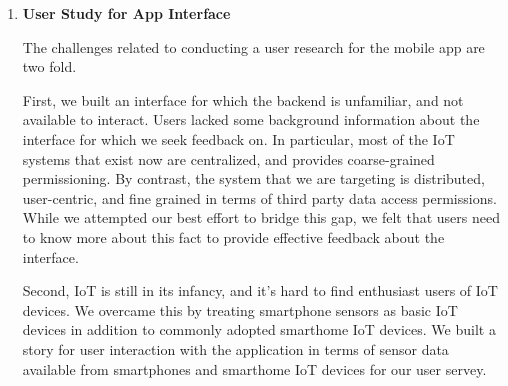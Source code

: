 \begin{enumerate}
\item \textbf{User Study for App Interface}

The challenges related to conducting a user research for the mobile app are two fold.

First, we built an interface for which the backend is unfamiliar, and not available to interact. Users lacked some background information about the interface for which we seek feedback on. In particular, most of the IoT systems that exist now are centralized, and provides coarse-grained permissioning. By contrast, the system that we are targeting is distributed, user-centric, and fine grained in terms of third party data access permissions. While we attempted our best effort to bridge this gap, we felt that users need to know more about this fact to provide effective feedback about the interface.

Second, IoT is still in its infancy, and it's hard to find enthusiast users of IoT devices. We overcame this by treating smartphone sensors as basic IoT devices in addition to commonly adopted smarthome IoT devices. We built a story for user interaction with the application in terms of sensor data available from smartphones and smarthome IoT devices for our user servey.
\end{enumerate}